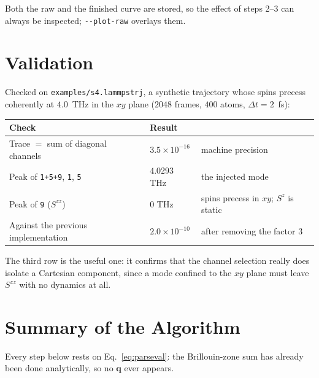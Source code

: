 \documentclass[12pt, a4paper, oneside]{article}
\newcommand{\qvec}{\mathbf{q}}
\newcommand{\field}{S}
\begin{document}
Both the raw and the finished curve are stored, so the effect of steps 2--3 can
always be inspected; \texttt{-\/-plot-raw} overlays them.

\section{Validation}

Checked on \texttt{examples/s4.lammpstrj}, a synthetic trajectory whose spins
precess coherently at $4.0$~THz in the $xy$ plane ($2048$ frames, $400$ atoms,
$\Delta t = 2$~fs):

\begin{center}
\begin{tabular}{lll}
    \toprule
    Check & Result & \\
    \midrule
    Trace $=$ sum of diagonal channels
        & $3.5\times10^{-16}$ & machine precision \\
    Peak of \texttt{1+5+9}, \texttt{1}, \texttt{5}
        & $4.0293$ THz & the injected mode \\
    Peak of \texttt{9} ($\field^{zz}$)
        & $0$ THz & spins precess in $xy$; $\field^z$ is static \\
    Against the previous implementation
        & $2.0\times10^{-10}$ & after removing the factor $3$ \\
    \bottomrule
\end{tabular}
\end{center}

The third row is the useful one: it confirms that the channel selection really
does isolate a Cartesian component, since a mode confined to the $xy$ plane
must leave $\field^{zz}$ with no dynamics at all.

\section{Summary of the Algorithm}

Every step below rests on Eq.~\eqref{eq:parseval}: the Brillouin-zone sum has
already been done analytically, so no $\qvec$ ever appears.
\end{document}
